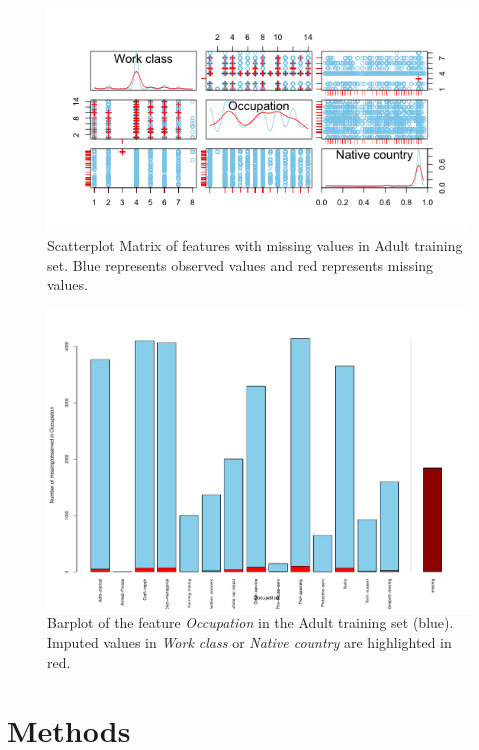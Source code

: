 \documentclass[12pt]{article}
\begin{document}
\begin{figure}[htbp] 
   \centering
   \includegraphics[scale=1]{scatter-matrix-missing.png} 
   \caption{Scatterplot Matrix of features with missing values in Adult training set. Blue represents observed values and red represents missing values.}
   \label{scatter-matrix-missing}
\end{figure}

\begin{figure}[htbp] 
   \centering
   \includegraphics[scale=0.6]{barplot-occ-missing.pdf} 
   \caption{Barplot of the feature \textit{Occupation} in the Adult training set (blue). Imputed values in \textit{Work class} or \textit{Native country} are highlighted in red.}
   \label{barplot-occ-missing}
\end{figure}

\section{Methods}
\end{document}
